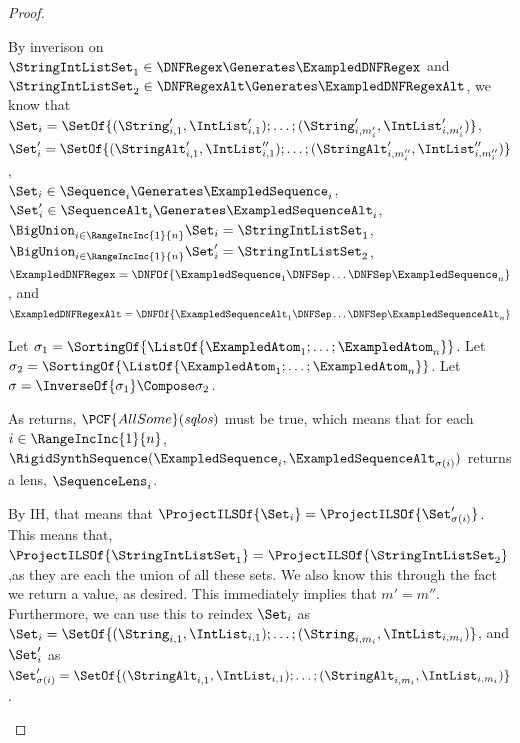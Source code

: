\documentclass[acmsmall,screen]{acmart}
\begin{document}
\begin{proof}
\begin{case}[dnfregex]
    By inverison on 
    $\StringIntListSet_1 \in \DNFRegex \Generates \ExampledDNFRegex$ and
    $\StringIntListSet_2 \in \DNFRegexAlt \Generates \ExampledDNFRegexAlt$,
    we know that\\
    $\Set_i = \SetOf{(\String_{i,1}',\IntList_{i,1}');\ldots;(\String_{i,m_i'}',\IntList_{i,m_i'}')}$,\\
    $\Set_i' =
    \SetOf{(\StringAlt_{i,1}',\IntList_{i,1}'');\ldots;(\StringAlt_{i,m_i''}',\IntList_{i,m_i''}'')}$,\\
    $\Set_i \in \Sequence_i \Generates \ExampledSequence_i$,\\
    $\Set_i' \in \SequenceAlt_i \Generates \ExampledSequenceAlt_i$,\\
    $\BigUnion_{i\in\RangeIncInc{1}{n}}\Set_i = \StringIntListSet_1$,\\
    $\BigUnion_{i\in\RangeIncInc{1}{n}}\Set_i' = \StringIntListSet_2$,\\
    $\ExampledDNFRegex = \DNFOf{\ExampledSequence_1 \DNFSep \ldots \DNFSep
      \ExampledSequence_n}$, and\\
    $\ExampledDNFRegexAlt = \DNFOf{\ExampledSequenceAlt_1 \DNFSep \ldots \DNFSep
      \ExampledSequenceAlt_n}$

    Let $\sigma_1 =
    \SortingOf{\ListOf{\ExampledAtom_1;\ldots;\ExampledAtom_n}}$.
    Let $\sigma_2 =
    \SortingOf{\ListOf{\ExampledAtom_1;\ldots;\ExampledAtom_n}}$.
    Let $\sigma = \InverseOf{\sigma_1} \Compose \sigma_2$.

    As \RigidSynthInternal{} returns, $\PCF{AllSome}(\mathit{sqlos})$ must be true, which
    means that for each $i\in\RangeIncInc{1}{n}$,
    $\RigidSynthSequence(\ExampledSequence_i,\ExampledSequenceAlt_{\sigma(i)})$ returns a
    lens, $\SequenceLens_i$.
    
    By IH, that means that
    $\ProjectILSOf{\Set_i}
    =
    \ProjectILSOf{\Set_{\sigma(i)}'}$.
    This means that, $\ProjectILSOf{\StringIntListSet_1} =
    \ProjectILSOf{\StringIntListSet_2}$,as they are each the union of all these
    sets.   We also know this through the fact we
    return a value, as desired.
    This immediately implies that $m' = m''$.
    Furthermore, we can use this to reindex $\Set_i$ as
    $\Set_i =
    \SetOf{(\String_{i,1},\IntList_{i,1});\ldots;(\String_{i,m_i},\IntList_{i,m_i})}$,
    and $\Set_i'$ as
    $\Set_{\sigma(i)}' =
    \SetOf{(\StringAlt_{i,1},\IntList_{i,1});\ldots;(\StringAlt_{i,m_i},\IntList_{i,m_i})}$.


\end{case}
\end{proof}
\end{document}
